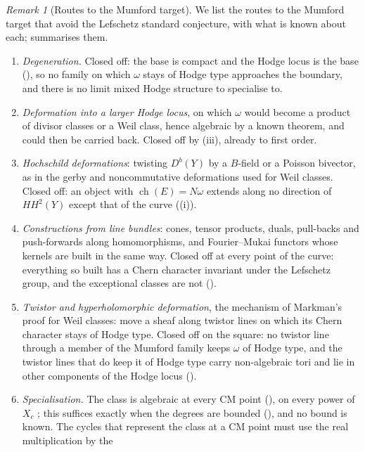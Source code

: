 \documentclass[11pt,reqno]{amsart}
\theoremstyle{plain}
\theoremstyle{definition}
\theoremstyle{remark}
\newtheorem{remark}[theorem]{Remark}
\DeclareMathOperator{\ch}{ch}
\begin{document}
\begin{remark}[Routes to the Mumford target]\label{rem:bypassaudit}
We list the routes to the Mumford target that avoid the Lefschetz standard
conjecture, with what is known about each;  summarises
them.
\begin{enumerate}[label=\textup{(\arabic*)},leftmargin=2.6em,itemsep=2pt]
\item \emph{Degeneration.} Closed off: the base is compact and the Hodge
  locus is the base (), so no family on which
  $\omega$ stays of Hodge type approaches the boundary, and there is no limit
  mixed Hodge structure to specialise to.
\item \emph{Deformation into a larger Hodge locus}, on which $\omega$ would
  become a product of divisor classes or a Weil class, hence algebraic by a
  known theorem, and could then be carried back. Closed off by
  (iii), already to first order.
\item \emph{Hochschild deformations}: twisting $D^{b}(Y)$ by a $B$-field or a
  Poisson bivector, as in the gerby and noncommutative deformations used for
  Weil classes. Closed off: an object with $\ch(E)=N\omega$ extends along no
  direction of $HH^{2}(Y)$ except that of the curve
  ((i)).
\item \emph{Constructions from line bundles}: cones, tensor products, duals,
  pull-backs and push-forwards along homomorphisms, and Fourier--Mukai
  functors whose kernels are built in the same way. Closed off at every point
  of the curve: everything so built has a Chern character invariant under the
  Lefschetz group, and the exceptional classes are not
  ().
\item \emph{Twistor and hyperholomorphic deformation}, the mechanism of
  Markman's proof for Weil classes: move a sheaf along twistor lines on which
  its Chern character stays of Hodge type. Closed off on the square: no
  twistor line through a member of the Mumford family keeps $\omega$ of Hodge
  type, and the twistor lines that do keep it of Hodge type carry
  non-algebraic tori and lie in other components of the Hodge locus
  ().
\item \emph{Specialisation.} The class is algebraic at every CM point
  (), on every power of $X_{c}$ \cite[Theorem~1.3]{Li26};
  this suffices exactly when the degrees are bounded
  (), and no bound is known. The cycles that
  represent the class at a CM point must use the real multiplication by the

\end{enumerate}
\end{remark}
\end{document}
